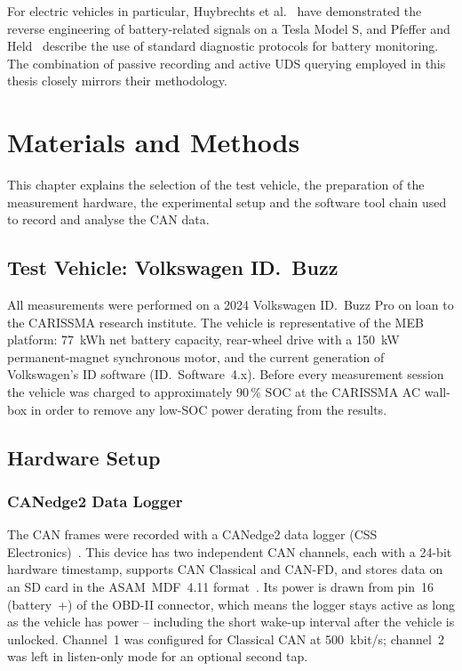 \documentclass[11pt,a4paper,oneside,parskip=half]{scrreprt}
\begin{document}
For electric vehicles in particular, Huybrechts et al.~\cite{huybrechts2018reverse} have demonstrated the reverse engineering of battery-related signals on a Tesla Model S, and Pfeffer and Held~\cite{pfeffer2022candid} describe the use of standard diagnostic protocols for battery monitoring. The combination of passive recording and active UDS querying employed in this thesis closely mirrors their methodology.

\chapter{Materials and Methods}
This chapter explains the selection of the test vehicle, the preparation of the measurement hardware, the experimental setup and the software tool chain used to record and analyse the CAN data.

\section{Test Vehicle: Volkswagen ID.~Buzz}
All measurements were performed on a 2024 Volkswagen ID.~Buzz Pro on loan to the CARISSMA research institute. The vehicle is representative of the MEB platform: 77~kWh net battery capacity, rear-wheel drive with a 150~kW permanent-magnet synchronous motor, and the current generation of Volkswagen's ID software (ID.~Software~4.x). Before every measurement session the vehicle was charged to approximately 90\,\% SOC at the CARISSMA AC wall-box in order to remove any low-SOC power derating from the results.

\section{Hardware Setup}
\subsection{CANedge2 Data Logger}
The CAN frames were recorded with a CANedge2 data logger (CSS Electronics)~\cite{csselectronics_canedge2}. This device has two independent CAN channels, each with a 24-bit hardware timestamp, supports CAN Classical and CAN-FD, and stores data on an SD card in the ASAM~MDF~4.11 format~\cite{asammdf}. Its power is drawn from pin~16 (battery~+) of the OBD-II connector, which means the logger stays active as long as the vehicle has power -- including the short wake-up interval after the vehicle is unlocked. Channel~1 was configured for Classical CAN at 500~kbit/s; channel~2 was left in listen-only mode for an optional second tap.
\end{document}
